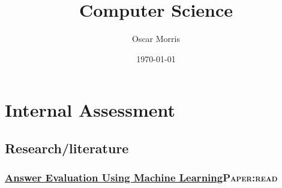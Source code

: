 \documentclass[11pt]{article}
\author{Oscar Morris}
\date{\today}
\title{Computer Science}
\begin{document}
\maketitle
\tableofcontents


\section{Internal Assessment}
\label{sec:org1b4aac3}
\subsection{Research/literature}
\label{sec:orgb59a898}
\subsubsection{\href{./cs/Answer\_Evaluation\_with\_ML.pdf}{Answer Evaluation Using Machine Learning}\hfill{}\textsc{Paper:read}}
\label{sec:org036bcbd}
\end{document}
